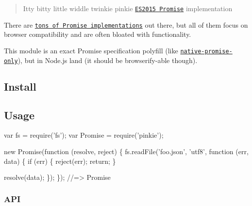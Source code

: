 \section*{~\newline
  ~\newline
 ~\newline
 }

\begin{quote}
Itty bitty little widdle twinkie pinkie \href{https://people.mozilla.org/~jorendorff/es6-draft.html#sec-promise-objects}{\tt E\+S2015 Promise} implementation \end{quote}


\href{https://travis-ci.org/floatdrop/pinkie}{\tt } \href{https://coveralls.io/github/floatdrop/pinkie?branch=master}{\tt }

There are \href{https://github.com/promises-aplus/promises-spec/blob/master/implementations.md#standalone}{\tt tons of Promise implementations} out there, but all of them focus on browser compatibility and are often bloated with functionality.

This module is an exact Promise specification polyfill (like \href{https://github.com/getify/native-promise-only}{\tt native-\/promise-\/only}), but in Node.\+js land (it should be browserify-\/able though).

\subsection*{Install}




\subsection*{Usage}


\begin{DoxyCode}
var fs = require('fs');
var Promise = require('pinkie');

new Promise(function (resolve, reject) \{
  fs.readFile('foo.json', 'utf8', function (err, data) \{
    if (err) \{
      reject(err);
      return;
    \}

    resolve(data);
  \});
\});
//=> Promise
\end{DoxyCode}


\subsubsection*{A\+PI}

